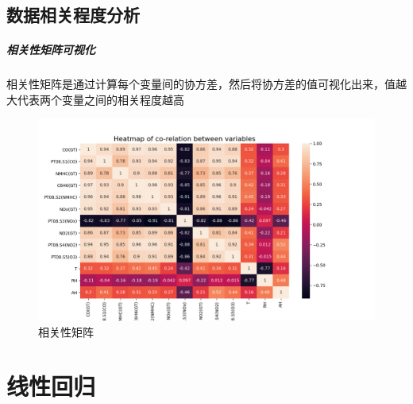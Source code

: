 \documentclass{ctexart}
\begin{document}
\subsection{数据相关程度分析}
\subparagraph{相关性矩阵可视化}
相关性矩阵是通过计算每个变量间的协方差，然后将协方差的值可视化出来，值越大代表两个变量之间的相关程度越高
\begin{figure}[H]
	\centering
	\includegraphics[width=1.3\textwidth]{../images/Figure_1.png}
	\caption{相关性矩阵}
\end{figure}
\section{线性回归}
\end{document}
